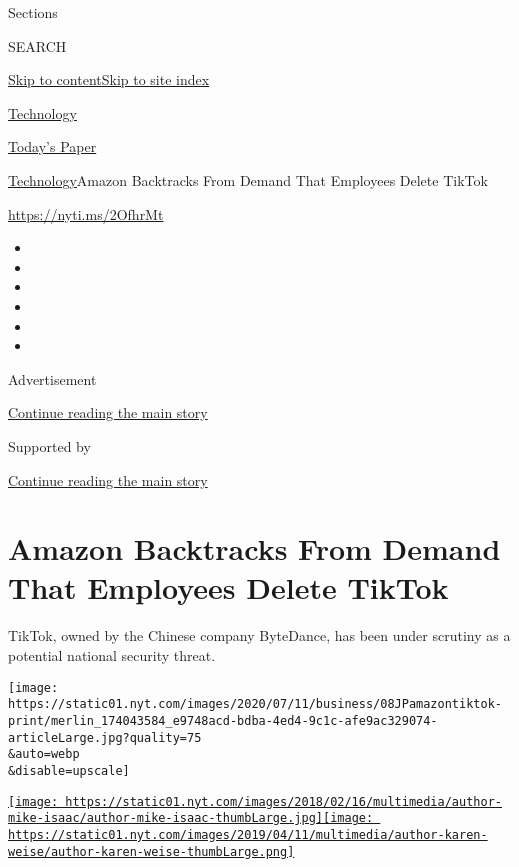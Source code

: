 Sections

SEARCH

\protect\hyperlink{site-content}{Skip to
content}\protect\hyperlink{site-index}{Skip to site index}

\href{https://www.nytimes.com/section/technology}{Technology}

\href{https://myaccount.nytimes.com/auth/login?response_type=cookie\&client_id=vi}{}

\href{https://www.nytimes.com/section/todayspaper}{Today's Paper}

\href{/section/technology}{Technology}\textbar{}Amazon Backtracks From
Demand That Employees Delete TikTok

\url{https://nyti.ms/2OfhrMt}

\begin{itemize}
\item
\item
\item
\item
\item
\item
\end{itemize}

Advertisement

\protect\hyperlink{after-top}{Continue reading the main story}

Supported by

\protect\hyperlink{after-sponsor}{Continue reading the main story}

\hypertarget{amazon-backtracks-from-demand-that-employees-delete-tiktok}{%
\section{Amazon Backtracks From Demand That Employees Delete
TikTok}\label{amazon-backtracks-from-demand-that-employees-delete-tiktok}}

TikTok, owned by the Chinese company ByteDance, has been under scrutiny
as a potential national security threat.

\texttt{[image: https://static01.nyt.com/images/2020/07/11/business/08JPamazontiktok-print/merlin\_174043584\_e9748acd-bdba-4ed4-9c1c-afe9ac329074-articleLarge.jpg?quality=75\\\&auto=webp\\\&disable=upscale]}

\href{https://www.nytimes.com/by/mike-isaac}{\texttt{[image: https://static01.nyt.com/images/2018/02/16/multimedia/author-mike-isaac/author-mike-isaac-thumbLarge.jpg]}}\href{https://www.nytimes.com/by/karen-weise}{\texttt{[image: https://static01.nyt.com/images/2019/04/11/multimedia/author-karen-weise/author-karen-weise-thumbLarge.png]}}

